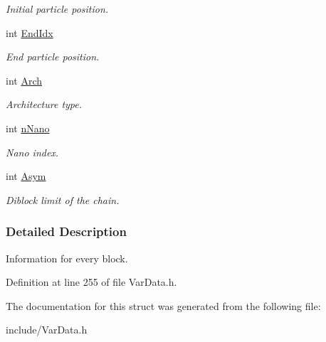 \begin{DoxyCompactItemize}
\begin{DoxyCompactList}\small\item\em \-Initial particle position. \end{DoxyCompactList}\item 
\hypertarget{structBLOCK_a3fa6306dcea956ea84ce7b5f2b22f628}{int \hyperlink{structBLOCK_a3fa6306dcea956ea84ce7b5f2b22f628}{\-End\-Idx}}\label{structBLOCK_a3fa6306dcea956ea84ce7b5f2b22f628}

\begin{DoxyCompactList}\small\item\em \-End particle position. \end{DoxyCompactList}\item 
\hypertarget{structBLOCK_ab953dc37c933d1b21ba1d94b87c65bca}{int \hyperlink{structBLOCK_ab953dc37c933d1b21ba1d94b87c65bca}{\-Arch}}\label{structBLOCK_ab953dc37c933d1b21ba1d94b87c65bca}

\begin{DoxyCompactList}\small\item\em \-Architecture type. \end{DoxyCompactList}\item 
\hypertarget{structBLOCK_ad984dd2cb572ac6c2deac801d0c2f947}{int \hyperlink{structBLOCK_ad984dd2cb572ac6c2deac801d0c2f947}{n\-Nano}}\label{structBLOCK_ad984dd2cb572ac6c2deac801d0c2f947}

\begin{DoxyCompactList}\small\item\em \-Nano index. \end{DoxyCompactList}\item 
\hypertarget{structBLOCK_af914cf19bda574d081fa0a7b243bf7dc}{int \hyperlink{structBLOCK_af914cf19bda574d081fa0a7b243bf7dc}{\-Asym}}\label{structBLOCK_af914cf19bda574d081fa0a7b243bf7dc}

\begin{DoxyCompactList}\small\item\em \-Diblock limit of the chain. \end{DoxyCompactList}\end{DoxyCompactItemize}


\subsubsection{\-Detailed \-Description}
\-Information for every block. 

\-Definition at line 255 of file \-Var\-Data.\-h.



\-The documentation for this struct was generated from the following file\-:\begin{DoxyCompactItemize}
\item 
include/\-Var\-Data.\-h\end{DoxyCompactItemize}
